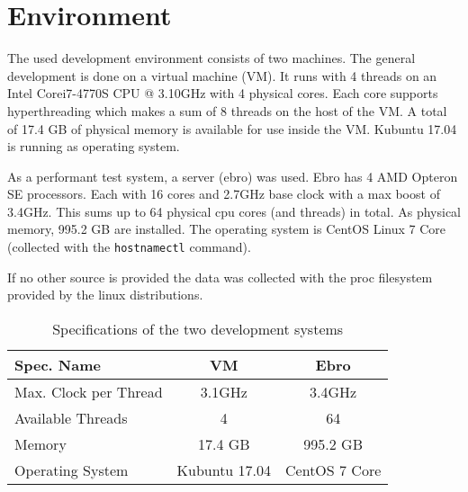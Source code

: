 \section{Environment}
\label{env}
The used development environment consists of two machines. The general development is done on a virtual machine (VM). It runs with 4 threads on an Intel\textsuperscript{\textregistered} Core\texttrademark i7-4770S CPU @ 3.10GHz with 4 physical cores. Each core supports hyperthreading which makes a sum of 8 threads on the host of the VM. A total of 17.4 GB of physical memory is available for use inside the VM. Kubuntu 17.04 is running as operating system.

As a performant test system, a server (ebro) was used. Ebro has 4 AMD Opteron SE processors. Each with 16 cores and 2.7GHz base clock with a max boost of 3.4GHz\cite{AMDSpecs}. This sums up to 64 physical cpu cores (and threads) in total. As physical memory, 995.2 GB are installed. The operating system is CentOS Linux 7 Core (collected with the \texttt{hostnamectl} command).

If no other source is provided the data was collected with the proc filesystem provided by the linux distributions.
\begin{center}
    \begin{table}[H]
        \centering
        \begin{tabular}{ | l | c | c |}
            \hline
            \textbf{Spec. Name} & \textbf{VM} & \textbf{Ebro} \\ \hline
            Max. Clock per Thread & 3.1GHz & 3.4GHz \\ 
            Available Threads & 4 & 64 \\ 
            Memory & 17.4 GB & 995.2 GB\\ 
            Operating System & Kubuntu 17.04 & CentOS 7 Core \\ \hline
        \end{tabular}
        \caption{Specifications of the two development systems}
    \end{table}
\end{center}


